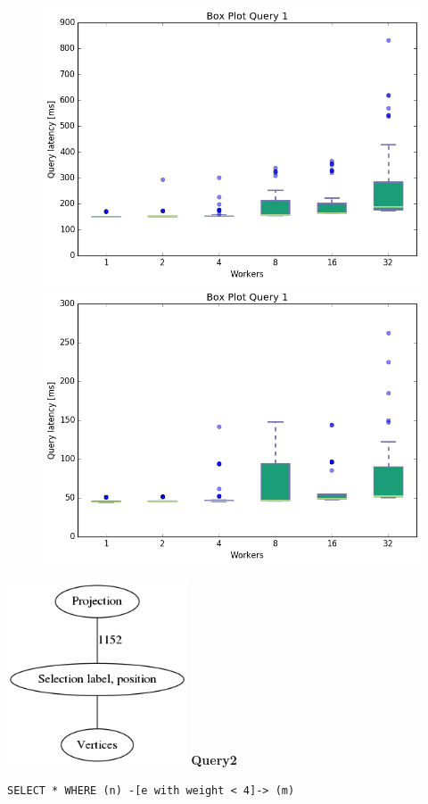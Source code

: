 \documentclass[11pt,singlecolumn]{scrartcl}
\begin{document}
\begin{figure}[!tbp]
  \centering
  \RawFloats
  \begin{minipage}[b]{0.5\textwidth}
    \includegraphics[width=\textwidth]{boxesjl/q1}
  \end{minipage}
  \hfill
  \begin{minipage}[b]{0.5\textwidth}
    \includegraphics[width=\textwidth]{boxesjs/q1}
  \end{minipage}
\end{figure}
\clearpage

\includegraphics[width=0.4\textwidth]{graph1}
\clearpage
\textbf{Query2}\\
\begin{verbatim}
SELECT * WHERE (n) -[e with weight < 4]-> (m)\end{verbatim}
\end{document}
